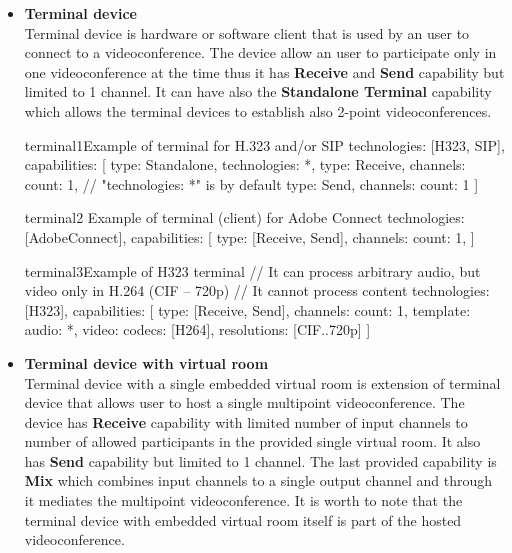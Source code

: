 \begin{itemize}

\item \textbf{Terminal device} \\
  Terminal device is hardware or software client that is used by an user to 
  connect to a videoconference. The device allow an user to participate only 
  in one videoconference at the time thus it has \textbf{Receive} and 
  \textbf{Send} capability but limited to 1 channel. It can have also the 
  \textbf{Standalone Terminal} capability which allows the terminal devices to  
  establish also 2-point videoconferences. 
  
\begin{ResourceExample}{}{terminal1}{Example of terminal for H.323 and/or SIP}
technologies: [H323, SIP],
capabilities: [
  {type: Standalone, technologies: *},
  {type: Receive, channels: {count: 1}}, // "technologies: *" is by default
  {type: Send, channels: {count: 1}}
]
\end{ResourceExample}

\begin{ResourceExample}{}{terminal2}%
      {Example of terminal (client) for Adobe Connect}
technologies: [AdobeConnect],
capabilities: [
  {type: [Receive, Send], channels: {count: 1}},
]
\end{ResourceExample}

\begin{ResourceExample}{}{terminal3}{Example of H323 terminal}
// It can process arbitrary audio, but video only in H.264 (CIF -- 720p)
// It cannot process content
technologies: [H323],
capabilities: [
  {type: [Receive, Send], channels: {
    count: 1, 
    template: {
      audio: *,
      video: {codecs: [H264], resolutions: [CIF..720p]}
    }  
  }}
]
\end{ResourceExample}

\item \textbf{Terminal device with virtual room} \\
  Terminal device with a single embedded virtual room is extension of terminal 
  device that allows user to host a single multipoint videoconference. The 
  device has \textbf{Receive} capability with limited number of input channels 
  to number of allowed participants in the provided single virtual room. It 
  also has \textbf{Send} capability but limited to 1 channel. The last 
  provided capability is \textbf{Mix} which combines input channels to a 
  single output channel and through it mediates the multipoint 
  videoconference. It is worth to note that the terminal device with embedded 
  virtual room itself is part of 
  the hosted videoconference.
  

\end{itemize}
